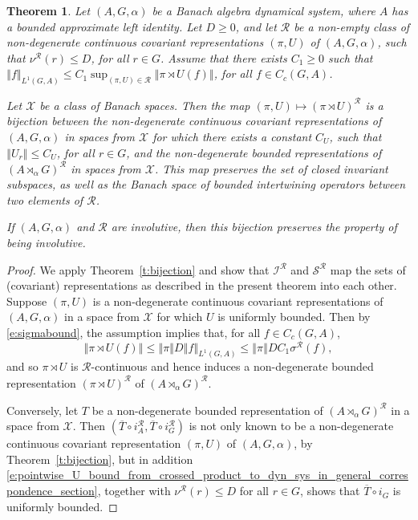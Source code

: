 \documentclass{amsart}
\theoremstyle{plain}
\newtheorem{theorem}{Theorem}[section]
\theoremstyle{definition}
\numberwithin{equation}{section}
\begin{document}
\begin{theorem}\label{t:L1_case}
 Let ${(A,G,\alpha)}$ be a Banach algebra dynamical system, where $A$ has a bounded approximate left identity. Let $D \geq 0$, and let ${\mathcal R}$ be a non-empty class of non-degenerate continuous covariant representations ${(\pi,U)}$ of ${(A,G,\alpha)}$, such that ${\nu^{\mathcal R}}(r) \leq D$, for all $r\in G$. Assume that there exists $C_1\geq 0$ such that ${\left\Vert {f} \right\Vert}_{L^1(G,A)} \leq C_1 \sup_{{(\pi,U)}\in{\mathcal R}}{\left\Vert {{\pi \rtimes U}(f)} \right\Vert}$, for all $f\in C_c(G,A)$.

Let ${\mathcal X}$ be a class of Banach spaces. Then the map ${(\pi,U)} \mapsto ({\pi \rtimes U})^{\mathcal R}$ is a bijection between the non-degenerate continuous covariant representations of ${(A,G,\alpha)}$ in spaces from ${\mathcal X}$ for which there exists a constant $C_U$, such that ${\left\Vert {U_r} \right\Vert}\leq C_U$, for all $r\in G$, and the non-degenerate bounded representations of ${(A {\rtimes}_\alpha G)^\mathcal{R}}$ in spaces from ${\mathcal X}$. This map preserves the set of closed invariant subspaces, as well as the Banach space of bounded intertwining operators between two elements of ${\mathcal R}$.

If ${(A,G,\alpha)}$ and ${\mathcal R}$ are involutive, then this bijection preserves the property of being involutive.
\end{theorem}

\begin{proof}
 We apply Theorem~\ref{t:bijection} and show that ${{\mathcal I}^{\mathcal R}}$ and ${{\mathcal S}^{\mathcal R}}$ map the sets of (covariant) representations as described in the present theorem into each other. Suppose ${(\pi,U)}$ is a non-degenerate continuous covariant representations of ${(A,G,\alpha)}$ in a space from ${\mathcal X}$ for which $U$ is uniformly bounded. Then by \eqref{e:sigmabound}, the assumption implies that, for all $f \in C_c(G,A)$,
\[ {\left\Vert {{\pi \rtimes U}(f)} \right\Vert} \leq {\left\Vert {\pi} \right\Vert} D {\left\Vert {f} \right\Vert}_{L^1(G,A)} \leq {\left\Vert {\pi} \right\Vert} D C_1 {\sigma^{\mathcal R}}(f), \]
and so ${\pi \rtimes U}$ is ${\mathcal R}$-continuous and hence induces a non-degenerate bounded representation ${(\pi \rtimes U)^\mathcal R}$ of ${(A {\rtimes}_\alpha G)^\mathcal{R}}$.

Conversely, let $T$ be a non-degenerate bounded representation of ${(A {\rtimes}_\alpha G)^\mathcal{R}}$ in a space from ${\mathcal X}$. Then $(\overline{T} \circ i_A^{\mathcal R}, \overline{T} \circ i_G^{\mathcal R})$ is not only known to be a non-degenerate continuous covariant representation ${(\pi,U)}$ of ${(A,G,\alpha)}$, by Theorem~\ref{t:bijection}, but in addition \eqref{e:pointwise_U_bound_from_crossed_product_to_dyn_sys_in_general_correspondence_section}, together with ${\nu^{\mathcal R}}(r) \leq D$ for all $r \in G$, shows that $\overline{T} \circ i_G$ is uniformly bounded.
\end{proof}
\end{document}
